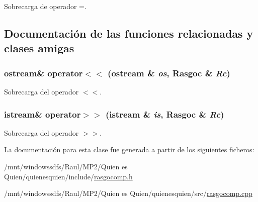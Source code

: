 Sobrecarga de operador =. 



\subsection{Documentación de las funciones relacionadas y clases amigas}
\hypertarget{class_rasgoc_c11a8a89e2f85849b22b3ee42aa58a02}{
\subsubsection[{operator$<$$<$}]{\setlength{\rightskip}{0pt plus 5cm}ostream\& operator$<$$<$ (ostream \& {\em os}, \/  {\bf Rasgoc} \& {\em Rc})}}
\label{class_rasgoc_c11a8a89e2f85849b22b3ee42aa58a02}


Sobrecarga del operador $<$$<$. 

\hypertarget{class_rasgoc_ac54876205c0d8a293f2d37f28e2aefc}{
\subsubsection[{operator$>$$>$}]{\setlength{\rightskip}{0pt plus 5cm}istream\& operator$>$$>$ (istream \& {\em is}, \/  {\bf Rasgoc} \& {\em Rc})}}
\label{class_rasgoc_ac54876205c0d8a293f2d37f28e2aefc}


Sobrecarga del operador $>$$>$. 



La documentación para esta clase fue generada a partir de los siguientes ficheros:\begin{CompactItemize}
\item 
/mnt/windowssdfs/Raul/MP2/Quien es Quien/quienesquien/include/\hyperlink{rasgocomp_8h}{rasgocomp.h}\item 
/mnt/windowssdfs/Raul/MP2/Quien es Quien/quienesquien/src/\hyperlink{rasgocomp_8cpp}{rasgocomp.cpp}\end{CompactItemize}
